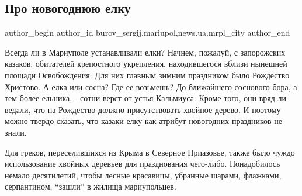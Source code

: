 
 
 
 
 
 
\subsection{Про новогоднюю елку}
\label{sec:30_12_2016.stz.news.ua.mrpl_city.1.pro_novogodnjuju_jelku}
 
\ifcmt
 author_begin
   author_id burov_sergij.mariupol,news.ua.mrpl_city
 author_end
\fi


Всегда ли в Мариуполе устанавливали елки? Начнем, пожалуй, с запорожских
казаков, обитателей крепостного укрепления, находившегося  вблизи нынешней
площади Освобождения. Для них главным зимним праздником было  Рождество
Христово. А елка или сосна? Где ее возьмешь? До ближайшего соснового бора, а
тем более ельника, - сотни верст от устья Кальмиуса. Кроме того, они вряд ли
ведали, что на Рождество должно присутствовать хвойное дерево. И поэтому можно
твердо сказать, что казаки  елку как атрибут новогодних праздников не знали.


Для греков, переселившихся из Крыма в Северное Приазовье, также было чуждо
использование хвойных деревьев для празднования чего-либо. Понадобилось немало
десятилетий, чтобы лесные красавицы, убранные шарами, флажками, серпантином,
\enquote{зашли} в жилища мариупольцев.


